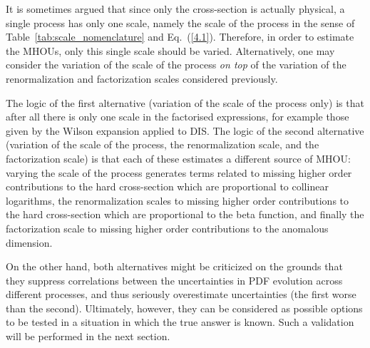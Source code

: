 It is sometimes argued that since only the cross-section is actually physical, 
a single process has only one scale, namely the scale of the process in the
sense of Table~\ref{tab:scale_nomenclature} and
Eq.~(\ref{4.1}).
%
Therefore,  in order to estimate the MHOUs, only this single scale should be varied.
%
Alternatively, one may consider the
variation of the scale of the process {\it on top} of the variation of
the renormalization and factorization scales considered
previously.

The logic of the first alternative (variation of the scale of the
process only) is that after all
there is only one scale in the factorised expressions, for example those given by the Wilson expansion applied to DIS.
%
The logic of the second alternative (variation of the scale of the process, the
renormalization scale, and the factorization scale) is that each of
these estimates a different source of MHOU:
varying the scale of the
process generates terms related to missing higher order contributions to the 
hard cross-section which are proportional to collinear logarithms, the
renormalization scales to missing higher order contributions to  the hard
cross-section which are proportional to the beta function, and finally
the factorization scale to missing higher order contributions to the anomalous
dimension.

On the other hand, both alternatives might be criticized on the grounds that they suppress correlations between the uncertainties in PDF evolution across
different processes, and thus seriously overestimate uncertainties (the first worse than the second). Ultimately, however, they can 
be considered as possible options to be tested in a situation
in which the true answer is known. Such a validation will be performed in the next section.

